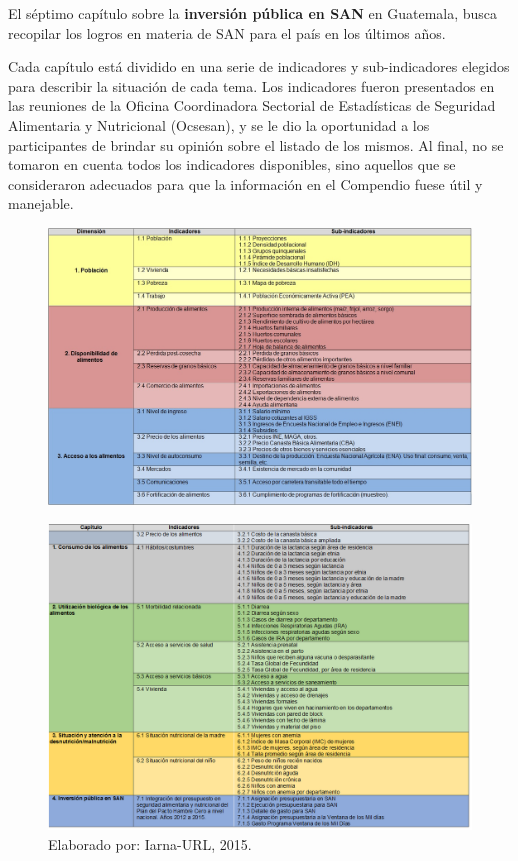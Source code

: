 El séptimo capítulo sobre la \textbf{inversión pública en SAN} en Guatemala, busca recopilar los logros en materia de SAN para el país en los últimos años.

Cada capítulo está dividido en una serie de indicadores y sub-indicadores elegidos para describir la situación de cada tema. Los indicadores fueron presentados en las reuniones de la Oficina Coordinadora Sectorial de Estadísticas de Seguridad Alimentaria y Nutricional (Ocsesan), y se le dio la oportunidad a los participantes de brindar su opinión sobre el listado de los mismos. Al final, no se tomaron en cuenta todos los indicadores disponibles, sino aquellos que se consideraron adecuados para que la información en el Compendio fuese útil y manejable.





\begin{landscape}
	
	\begin{figure}
		\centering
		\includegraphics[width=1.4\textwidth]{cuadro1}
		\label{cuadro1}
	\end{figure}
\end{landscape}

\begin{landscape}
	
	\begin{figure}
		\centering
		\includegraphics[width=1.4\textwidth]{cuadro2}
				\caption{Elaborado por: Iarna-URL, 2015.}
		\label{cuadro2}
	\end{figure}
\end{landscape}
